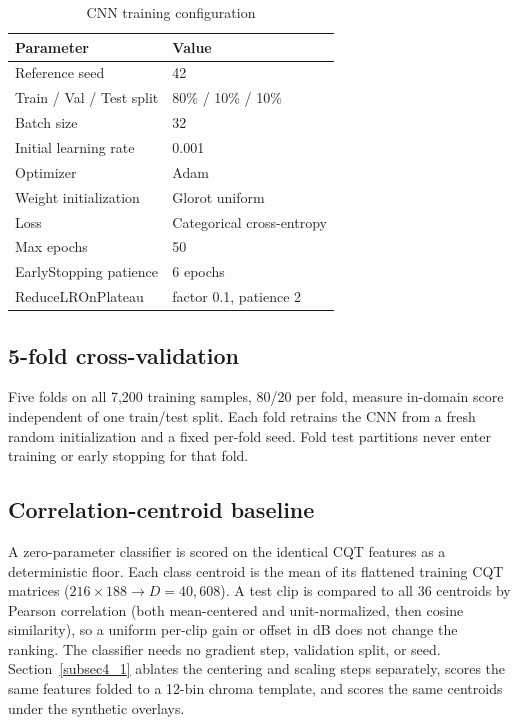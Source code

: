 \documentclass[pdflatex,sn-mathphys-num,iicol]{sn-jnl}
\theoremstyle{thmstyleone}
\theoremstyle{thmstyletwo}
\theoremstyle{thmstylethree}
\begin{document}
\begin{table}[t]
\caption{CNN training configuration}\label{tab:cnn-training-config}
\begin{tabular}{@{}ll@{}}
\toprule
Parameter & Value \\
\midrule
Reference seed & 42 \\
Train / Val / Test split & 80\% / 10\% / 10\% \\
Batch size & 32 \\
Initial learning rate & 0.001 \\
Optimizer & Adam \\
Weight initialization & Glorot uniform \\
Loss & Categorical cross-entropy \\
Max epochs & 50 \\
EarlyStopping patience & 6 epochs \\
ReduceLROnPlateau & factor 0.1, patience 2 \\
\bottomrule
\end{tabular}
\end{table}

\subsection{5-fold cross-validation}\label{subsec3_5}

Five folds on all 7{,}200 training samples, 80/20 per fold, measure in-domain score independent of one train/test split. Each fold retrains the CNN from a fresh random initialization and a fixed per-fold seed. Fold test partitions never enter training or early stopping for that fold.

\subsection{Correlation-centroid baseline}\label{subsec3_baseline}

A zero-parameter classifier is scored on the identical CQT features as a deterministic floor. Each class centroid is the mean of its flattened training CQT matrices ($216\times188 \to D=40{,}608$). A test clip is compared to all 36 centroids by Pearson correlation (both mean-centered and unit-normalized, then cosine similarity), so a uniform per-clip gain or offset in dB does not change the ranking. The classifier needs no gradient step, validation split, or seed. Section~\ref{subsec4_1} ablates the centering and scaling steps separately, scores the same features folded to a 12-bin chroma template, and scores the same centroids under the synthetic overlays.
\end{document}
